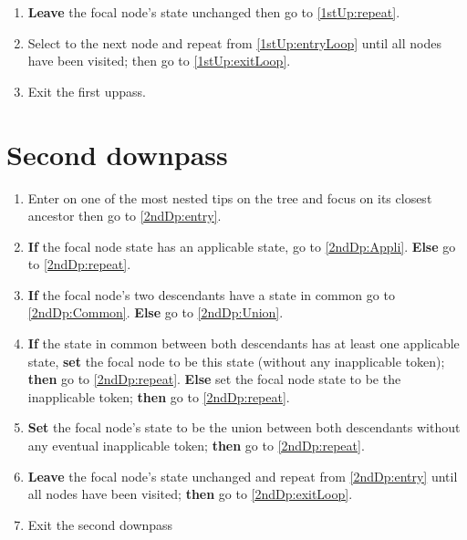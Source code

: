 \documentclass[a4paper,12pt]{article}
\begin{document}
\begin{enumerate}
    \item \label{1stUp:NodeApplicable} \textbf{Leave} the focal node's state unchanged then go to \ref{1stUp:repeat}.
    \item \label{1stUp:repeat} Select to the next node and repeat from \ref{1stUp:entryLoop} until all nodes have been visited; then go to \ref{1stUp:exitLoop}.
    \item \label{1stUp:exitLoop} Exit the first uppass.
\end{enumerate}

\section{Second downpass} \label{2ndDp}

\begin{enumerate}
    \item Enter on one of the most nested tips on the tree and focus on its closest ancestor then go to \ref{2ndDp:entry}.
    \item \label{2ndDp:entry} \textbf{If} the focal node state has an applicable state, go to \ref{2ndDp:Appli}. \textbf{Else} go to \ref{2ndDp:repeat}.
    \item \label{2ndDp:Appli} \textbf{If} the focal node's two descendants have a state in common go to \ref{2ndDp:Common}. \textbf{Else} go to \ref{2ndDp:Union}.
    \item \label{2ndDp:Common} \textbf{If} the state in common between both descendants has at least one applicable state, \textbf{set} the focal node to be this state (without any inapplicable token); \textbf{then} go to \ref{2ndDp:repeat}. \textbf{Else} set the focal node state to be the inapplicable token; \textbf{then} go to \ref{2ndDp:repeat}.
    \item \label{2ndDp:Union} \textbf{Set} the focal node's state to be the union between both descendants without any eventual inapplicable token; \textbf{then} go to \ref{2ndDp:repeat}.
    \item \label{2ndDp:repeat} \textbf{Leave} the focal node's state unchanged and repeat from \ref{2ndDp:entry} until all nodes have been visited; \textbf{then} go to \ref{2ndDp:exitLoop}.
    \item \label{2ndDp:exitLoop} Exit the second downpass
\end{enumerate}
\end{document}

